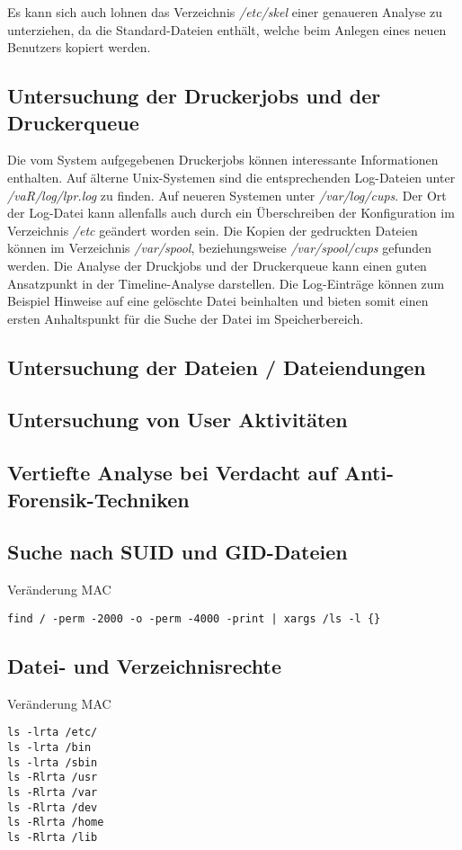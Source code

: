 Es kann sich auch lohnen das Verzeichnis \textit{/etc/skel} einer genaueren Analyse zu unterziehen, da die Standard-Dateien enthält, welche beim Anlegen eines neuen Benutzers kopiert werden.
	

\subsection{Untersuchung der Druckerjobs und der Druckerqueue}
Die vom System aufgegebenen Druckerjobs können interessante Informationen enthalten. Auf älterne Unix-Systemen sind die entsprechenden Log-Dateien unter \textit{/vaR/log/lpr.log} zu finden. Auf neueren Systemen unter \textit{/var/log/cups}. Der Ort der Log-Datei kann allenfalls auch durch ein Überschreiben der Konfiguration im Verzeichnis \textit{/etc} geändert worden sein. Die Kopien der gedruckten Dateien können im Verzeichnis \textit{/var/spool}, beziehungsweise \textit{/var/spool/cups} gefunden werden. Die Analyse der Druckjobs und der Druckerqueue kann einen guten Ansatzpunkt in der Timeline-Analyse darstellen. Die Log-Einträge können zum Beispiel Hinweise auf eine gelöschte Datei beinhalten und bieten somit einen ersten Anhaltspunkt für die Suche der Datei im Speicherbereich.



\subsection{Untersuchung der Dateien / Dateiendungen}

\subsection{Untersuchung von User Aktivitäten}

\subsection{Vertiefte Analyse bei Verdacht auf Anti-Forensik-Techniken}

\subsection{Suche nach SUID und GID-Dateien}
Veränderung MAC
\begin{lstlisting}
find / -perm -2000 -o -perm -4000 -print | xargs /ls -l {}
\end{lstlisting}

\subsection{Datei- und Verzeichnisrechte}
Veränderung MAC
\begin{lstlisting}
ls -lrta /etc/
ls -lrta /bin
ls -lrta /sbin
ls -Rlrta /usr
ls -Rlrta /var
ls -Rlrta /dev
ls -Rlrta /home
ls -Rlrta /lib
\end{lstlisting}

